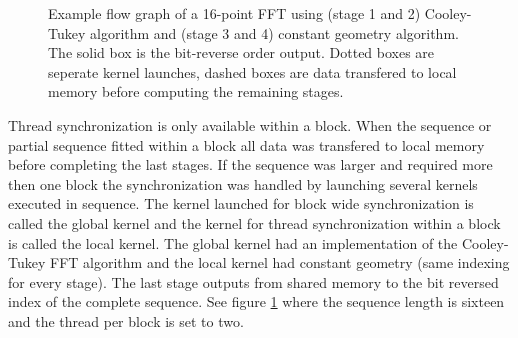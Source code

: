 \begin{figure}
	
	\caption{Example flow graph of a 16-point FFT using (stage 1 and 2) Cooley-Tukey algorithm and (stage 3 and 4) constant geometry algorithm. The solid box is the bit-reverse order output. Dotted boxes are seperate kernel launches, dashed boxes are data transfered to local memory before computing the remaining stages.}
	\label{fig:flowgraph-16}
\end{figure}

Thread synchronization is only available within a block. When the sequence or partial sequence fitted within a block all data was transfered to local memory before completing the last stages. If the sequence was larger and required more then one block the synchronization was handled by launching several kernels executed in sequence. The kernel launched for block wide synchronization is called the global kernel and the kernel for thread synchronization within a block is called the local kernel. The global kernel had an implementation of the Cooley-Tukey FFT algorithm and the local kernel had constant geometry (same indexing for every stage). The last stage outputs from shared memory to the bit reversed index of the complete sequence. See figure \ref{fig:flowgraph-16} where the sequence length is sixteen and the thread per block is set to two.

